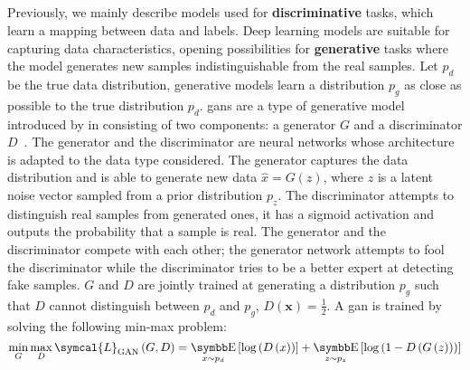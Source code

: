 \documentclass[../main.tex]{subfiles}
\begin{document}
	\subsection{}\label{sec:gan}
		Previously, we mainly describe models used for \textbf{discriminative} tasks, which learn a mapping between data and labels.
		Deep learning models are suitable for capturing data characteristics, opening possibilities for \textbf{generative} tasks where the model generates new samples indistinguishable from the real samples.
		Let \(p_{d}\) be the true data distribution, generative models learn a distribution \(p_{g}\) as close as possible to the true distribution \(p_{d}\).
		\Glspl{gan} are a type of generative model introduced by \citeauthor{Goodfellow2014GAN} in \citeyear{Goodfellow2014GAN} consisting of two components: a generator \(G\) and a discriminator \(D\)~\cite{Goodfellow2014GAN}.
		The generator and the discriminator are neural networks whose architecture is adapted to the data type considered.
		The generator captures the data distribution and is able to generate new data \(\hat{x} = G\left(z\right)\), where \(z\) is a latent noise vector sampled from a prior distribution \(p_z\).
		The discriminator attempts to distinguish real samples from generated ones, it has a sigmoid activation and outputs the probability that a sample is real.
		The generator and the discriminator compete with each other; the generator network attempts to fool the discriminator while the discriminator tries to be a better expert at detecting fake samples.
		\(G\) and \(D\) are jointly trained at generating a distribution \(p_{g}\) such that \(D\) cannot distinguish between \(p_{d}\) and \(p_{g}\), \ie{}\(D\left(\symbf{x}\right) = \tfrac12\).
		A \gls{gan} is trained by solving the following min-max problem:
		\begin{equation}
			\min_{G} \max_{D} \symcal{L}_{\text{GAN}}\left(G,D\right) = \E_{x\sim p_{d}}\left[ \log\left(D\left(x\right)\right)\right] + \E_{z\sim p_{z}}\left[ \log\left( 1 - D\left(G\left(z\right)\right)\right)\right] \label{eq:gan_loss}
		\end{equation}
\end{document}
